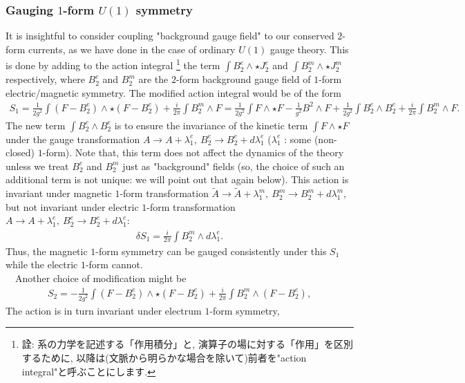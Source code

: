 \documentclass{ltjsarticle}
\theoremstyle{mystyle} %
\numberwithin{equation}{section}
\begin{document}
 \subsubsection{Gauging $1$-form $U(1)$ symmetry}
 It is insightful to consider coupling "background gauge field" to our conserved $2$-form currents, as we have done in the case of ordinary $U(1)$ gauge theory. 
This is done by adding to the action integral
\footnote{詮: 系の力学を記述する「作用積分」と, 演算子の場に対する「作用」を区別するために, 以降は(文脈から明らかな場合を除いて)前者を"action integral"と呼ぶことにします. }
 the term $\int B^e_2\wedge \star J^e_2$ and $\int B^m_2\wedge \star J^m_2$ respectively, 
where $B^e_2$ and $B^m_2$ are the $2$-form background gauge field of $1$-form electric/magnetic symmetry.  
The modified action integral would be of the form 
\begin{align}
    S_1=\frac{1}{2g^2}\int (F-B^e_2)\wedge \star (F-B^e_2) 
    +\frac{i}{2\pi}\int B^m_2 \wedge F
    =\frac{1}{2g^2}\int F\wedge \star F -\frac{1}{g^2} B^2 \wedge F
    +\frac{1}{2g^2}\int B^e_2\wedge B^e_2 + 
    \frac{i}{2\pi}\int B^m_2\wedge F. 
\label{Gauging1formSym}
\end{align}
The new term $\int B^e_2\wedge B^e_2$ is to ensure the invariance of the kinetic term $\int F\wedge \star F$
under the gauge transformation $A\to A+ \lambda^e_1,~ B^e_{2}\to B^e_2 + d\lambda^e_1$ ($\lambda^e_1$ : some (non-closed) $1$-form). 
Note that, this term does not affect the dynamics of the theory unless we treat $B^e_2$ and $B^m_2$ just as "background" fields 
(so, the choice of such an additional term is not unique: we will point out that again below). 
This action is invariant under magnetic $1$-form transformation $\tilde{A} \to \tilde{A}+\lambda^{m}_1, ~B^m_2\to B^m_2 + d\lambda^m_1$, 
but not invariant under electric $1$-form transformation $A\to A+ \lambda^e_1,~ B^e_{2}\to B^e_2 + d\lambda^e_1$: 
\begin{align}
    \delta S_1 = \frac{i}{2\pi}\int B^m_2\wedge d\lambda^e_1. 
    \label{eleAno}
\end{align}
Thus, the magnetic $1$-form symmetry can be gauged consistently under this $S_1$ while the electric $1$-form cannot. \\
　Another choice of modification might be
\begin{align}
    S_2 = -\frac{1}{2g^2}\int (F-B^e_2)\wedge \star (F-B^e_2)
    +\frac{i}{2\pi}\int B^m_2\wedge(F-B^e_2), 
\end{align}
The action is in turn invariant under electrum $1$-form symmetry, 
\end{document}
